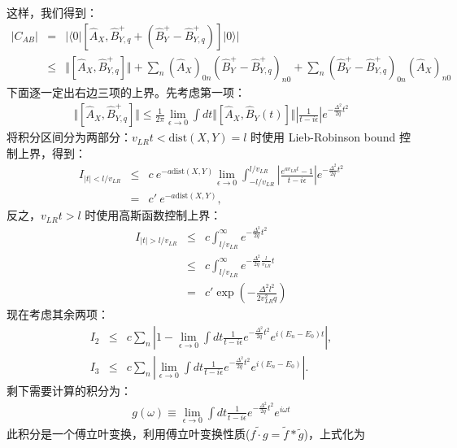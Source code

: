 \documentclass[10pt,UTF8]{ctexart}
\begin{document}
这样，我们得到：
\begin{eqnarray}
	|C_{AB}| &=& |\langle 0|[\hat{A}_X, \hat{B}_{Y,q}^{+} + (\hat{B}_{Y}^{+}-\hat{B}_{Y,q}^{+})]|0\rangle| \nonumber \\
	&\le & 
	\Vert [\hat{A}_X, \hat{B}_{Y,q}^{+}] \Vert + 
	\sum_n (\hat{A}_X)_{0n}(\hat{B}_{Y}^{+}-\hat{B}_{Y,q}^{+})_{n0} +
	\sum_n (\hat{B}_{Y}^{+}-\hat{B}_{Y,q}^{+})_{0n}(\hat{A}_X)_{n0}
\end{eqnarray}
下面逐一定出右边三项的上界。先考虑第一项：
\begin{eqnarray}
	\Vert [\hat{A}_X, \hat{B}_{Y,q}^{+}] \Vert
	\le \frac{1}{2\pi} \lim_{\epsilon\rightarrow 0} \int dt \Vert [\hat{A}_{X},\hat{B}_{Y}(t)] \Vert \left|\frac{1}{t-i\epsilon}\right| e^{-\frac{\Delta^2}{2q}t^2} 
\end{eqnarray}
将积分区间分为两部分：$ v_{LR}t < \mathrm{dist}(X,Y)=l$ 时使用 Lieb-Robinson bound 控制上界，得到：
\begin{eqnarray}
	I_{|t|<l/v_{LR}}
	&\le & c\ e^{-a \mathrm{dist}(X,Y)} \lim_{\epsilon \rightarrow 0} \int_{-l/v_{LR}}^{l/v_{LR}} \left|\frac{e^{av_{LR}t}-1}{t-i\epsilon} \right| e^{-\frac{\Delta^2}{2q}t^2} \nonumber \\
	&=& c'\ e^{-a \mathrm{dist}(X,Y)},
\end{eqnarray}
反之，$ v_{LR}t > l $ 时使用高斯函数控制上界：
\begin{eqnarray}
	I_{|t|>l/v_{LR}}
	&\le & c \int_{l/v_{LR}}^{\infty} e^{-\frac{\Delta^2}{2q}t^2} \nonumber \\
	&\le & c \int_{l/v_{LR}}^{\infty} e^{-\frac{\Delta^2}{2q} \frac{l}{v_{LR}}t} \nonumber \\
	&= & c' \exp\left(-\frac{\Delta^2 l^2}{2v_{LR}^{2}q} \right)
\end{eqnarray}
现在考虑其余两项：
\begin{eqnarray}
	I_2 &\le & c \sum_n \left|1-\lim_{\epsilon\rightarrow 0}\int dt \frac{1}{t-i\epsilon}e^{-\frac{\Delta^2}{2q}t^2}e^{i(E_n-E_0)t} \right|, \\
	I_3 &\le & c \sum_n \left| \lim_{\epsilon\rightarrow 0}\int dt \frac{1}{t-i\epsilon}e^{-\frac{\Delta^2}{2q}t^2}e^{i(E_n-E_0)} \right|.
\end{eqnarray}
剩下需要计算的积分为：
\begin{eqnarray}
	g(\omega) \equiv \lim_{\epsilon\rightarrow 0} \int dt \frac{1}{t-i\epsilon}e^{-\frac{\Delta^2}{2q}t^2}e^{i\omega t}
\end{eqnarray}
此积分是一个傅立叶变换，利用傅立叶变换性质($\widetilde{f \cdot g} = \tilde{f} * \tilde{g}$)，上式化为
\end{document}
